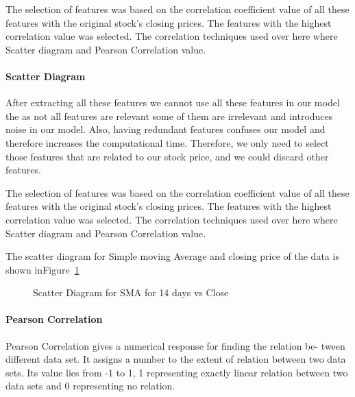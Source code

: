 \documentclass[5p,,preprint,12pt,twocolumn]{elsarticle}
\makeatletter
\def\fixFloatSize#1{}%
\makeatother
\begin{document}
The selection of features was based on the correlation coefficient value of all these features with the original stock's closing prices. The features with the highest correlation value was selected. The correlation techniques used over here where Scatter diagram and Pearson Correlation value.



\paragraph{Scatter Diagram}After extracting all these features we cannot use all these features in our model the as not all features are relevant some of them are irrelevant and introduces noise in our model. Also, having redundant features confuses our model and therefore increases the computational time. Therefore, we only need to select those features that are related to our stock price, and we could discard other features.

The selection of features was based on the correlation coefficient value of all these features with the original stock's closing prices. The features with the highest correlation value was selected. The correlation techniques used over here where Scatter diagram and Pearson Correlation value.

The scatter diagram for Simple moving Average and closing price of the data is shown inFigure~\ref{f-3c29855fadb4}


\bgroup
\fixFloatSize{images/3e4c774f-006a-4ee9-ba85-51801c340351-uscatter-diagram-ma14-days.png}
\begin{figure}[!htbp]
\centering \makeatletter{}
\makeatother 
\caption{{Scatter Diagram for SMA for 14 days vs Close}}
\label{f-3c29855fadb4}
\end{figure}
\egroup




\paragraph{Pearson Correlation}Pearson Correlation gives a numerical response for finding the relation be- tween different data set. It assigns a number to the extent of relation between two data sets. Its value lies from -1 to 1, 1 representing exactly linear relation between two data sets and 0 representing no relation.
\end{document}
